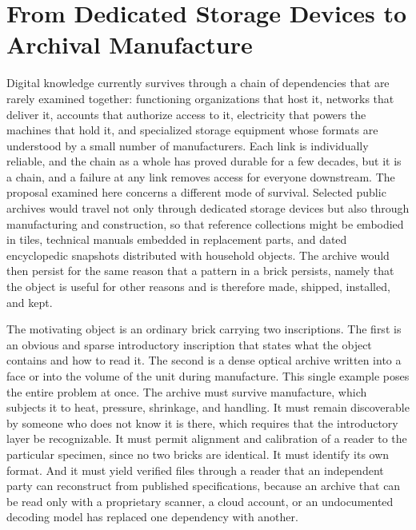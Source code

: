 \section{From Dedicated Storage Devices to Archival Manufacture}\label{sec:intro}

Digital knowledge currently survives through a chain of dependencies that are rarely examined together: functioning organizations that host it, networks that deliver it, accounts that authorize access to it, electricity that powers the machines that hold it, and specialized storage equipment whose formats are understood by a small number of manufacturers. Each link is individually reliable, and the chain as a whole has proved durable for a few decades, but it is a chain, and a failure at any link removes access for everyone downstream. The proposal examined here concerns a different mode of survival. Selected public archives would travel not only through dedicated storage devices but also through manufacturing and construction, so that reference collections might be embodied in tiles, technical manuals embedded in replacement parts, and dated encyclopedic snapshots distributed with household objects. The archive would then persist for the same reason that a pattern in a brick persists, namely that the object is useful for other reasons and is therefore made, shipped, installed, and kept.

The motivating object is an ordinary brick carrying two inscriptions. The first is an obvious and sparse introductory inscription that states what the object contains and how to read it. The second is a dense optical archive written into a face or into the volume of the unit during manufacture. This single example poses the entire problem at once. The archive must survive manufacture, which subjects it to heat, pressure, shrinkage, and handling. It must remain discoverable by someone who does not know it is there, which requires that the introductory layer be recognizable. It must permit alignment and calibration of a reader to the particular specimen, since no two bricks are identical. It must identify its own format. And it must yield verified files through a reader that an independent party can reconstruct from published specifications, because an archive that can be read only with a proprietary scanner, a cloud account, or an undocumented decoding model has replaced one dependency with another.

